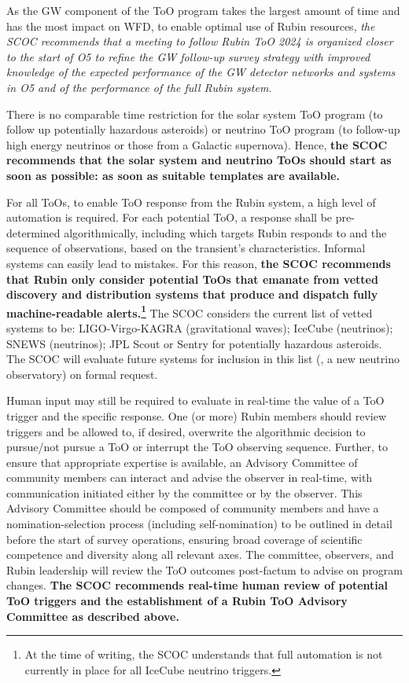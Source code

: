 As the GW component of the ToO program takes the largest amount of time and has the most impact on WFD, to enable optimal use of Rubin resources, {\it the SCOC recommends that a meeting to follow Rubin ToO 2024 is organized closer to the start of O5 to refine the GW follow-up survey strategy with improved knowledge of the expected performance of the GW detector networks and systems in O5 and of the performance of the full Rubin system.}
%

There is no comparable time restriction for the solar system ToO program (to follow up potentially hazardous asteroids) or neutrino ToO program (to follow-up high energy neutrinos or those from a Galactic supernova). Hence, {\bf the SCOC recommends that the solar system and neutrino ToOs should start as soon as possible: as soon as suitable templates are available.} 



For all ToOs, to enable ToO response from the Rubin system, a high level of automation is required. For each potential ToO, a response shall be pre-determined algorithmically, including which targets Rubin responds to and the sequence of observations, based on the transient’s characteristics. Informal systems can easily lead to mistakes. For this reason, {\bf the SCOC recommends that Rubin only consider potential ToOs that emanate from vetted discovery and distribution systems that produce and dispatch fully machine-readable alerts.\footnote{At the time of writing, the SCOC understands that full automation is not currently in place for all IceCube neutrino triggers.}} The SCOC considers the current list of vetted systems to be: LIGO-Virgo-KAGRA (gravitational waves); IceCube (neutrinos); SNEWS (neutrinos); JPL Scout or Sentry for potentially hazardous asteroids. The SCOC will evaluate future systems for inclusion in this list (\eg , a new neutrino observatory) on formal request.

Human input may still be required to evaluate in real-time the value of a ToO trigger and the specific response. One (or more) Rubin members %
should review triggers and be allowed to, if desired, overwrite the algorithmic decision to pursue/not pursue a ToO or interrupt the ToO observing sequence. Further, to ensure that appropriate expertise is available, an Advisory Committee of community members can interact and advise the observer in real-time, with communication initiated either by the committee or by the observer. 
This Advisory Committee should be composed of community members and have a nomination-selection process (including self-nomination) to be outlined in detail before the start of survey operations, ensuring broad coverage of scientific competence and diversity along all relevant axes.
The committee, observers, and Rubin leadership will review the ToO outcomes post-factum to advise on program changes. 
{\bf The SCOC recommends real-time human review of potential ToO triggers and the establishment of a Rubin ToO Advisory Committee as described above.}



